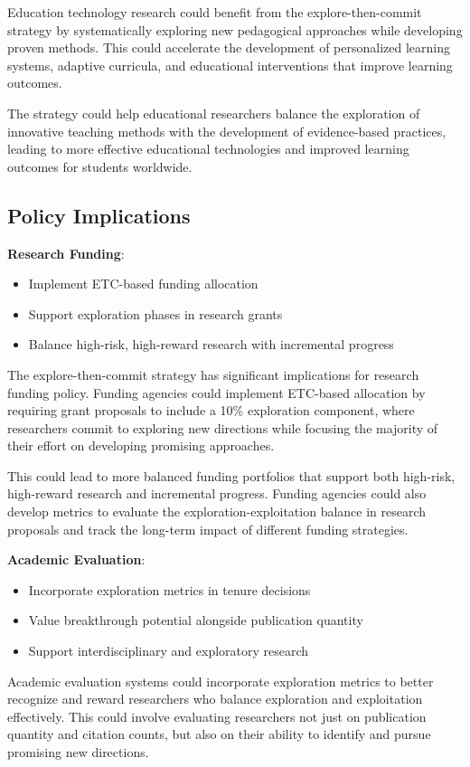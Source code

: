 \documentclass[letterpaper]{article} %
\begin{document}
Education technology research could benefit from the explore-then-commit strategy by systematically exploring new pedagogical approaches while developing proven methods. This could accelerate the development of personalized learning systems, adaptive curricula, and educational interventions that improve learning outcomes.

The strategy could help educational researchers balance the exploration of innovative teaching methods with the development of evidence-based practices, leading to more effective educational technologies and improved learning outcomes for students worldwide.

\subsection{Policy Implications}

\textbf{Research Funding}:
\begin{itemize}
\item Implement ETC-based funding allocation
\item Support exploration phases in research grants
\item Balance high-risk, high-reward research with incremental progress
\end{itemize}

The explore-then-commit strategy has significant implications for research funding policy. Funding agencies could implement ETC-based allocation by requiring grant proposals to include a 10\% exploration component, where researchers commit to exploring new directions while focusing the majority of their effort on developing promising approaches.

This could lead to more balanced funding portfolios that support both high-risk, high-reward research and incremental progress. Funding agencies could also develop metrics to evaluate the exploration-exploitation balance in research proposals and track the long-term impact of different funding strategies.

\textbf{Academic Evaluation}:
\begin{itemize}
\item Incorporate exploration metrics in tenure decisions
\item Value breakthrough potential alongside publication quantity
\item Support interdisciplinary and exploratory research
\end{itemize}

Academic evaluation systems could incorporate exploration metrics to better recognize and reward researchers who balance exploration and exploitation effectively. This could involve evaluating researchers not just on publication quantity and citation counts, but also on their ability to identify and pursue promising new directions.
\end{document}
